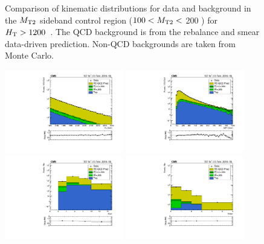 \begin{figure}[!htbp]
\begin{center}
    \caption{Comparison of kinematic distributions for data and background in the $M_{\mathrm{T2}}$ sideband control region ($100< M_{\mathrm{T2}} <$ 200 \GeV) for $H_{\mathrm{T}} > 1200$~\GeV. The QCD background is from the
             rebalance and smear data-driven prediction. Non-QCD backgrounds are taken from Monte Carlo.
            }
    \label{Fig:rs_crRSMT2SideBandInclusiveHT1200toInf}
  \end{center}
\end{figure}

\begin{figure}[!htbp]
  \begin{center}
    \includegraphics[width=0.46\textwidth]{figs/qcd/rs_data/c_crRSDPhiMT2InclusiveHT1200toInf_h_ht.pdf}
    \includegraphics[width=0.46\textwidth]{figs/qcd/rs_data/c_crRSDPhiMT2InclusiveHT1200toInf_h_met.pdf}
    \includegraphics[width=0.46\textwidth]{figs/qcd/rs_data/c_crRSDPhiMT2InclusiveHT1200toInf_h_nJet30.pdf}
    \includegraphics[width=0.46\textwidth]{figs/qcd/rs_data/c_crRSDPhiMT2InclusiveHT1200toInf_h_nBJet20.pdf}

\end{center}
\end{figure}
